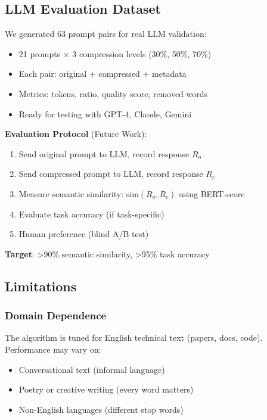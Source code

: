 \subsection{LLM Evaluation Dataset}

We generated 63 prompt pairs for real LLM validation:

\begin{itemize}
    \item 21 prompts × 3 compression levels (30\%, 50\%, 70\%)
    \item Each pair: original + compressed + metadata
    \item Metrics: tokens, ratio, quality score, removed words
    \item Ready for testing with GPT-4, Claude, Gemini
\end{itemize}

\textbf{Evaluation Protocol} (Future Work):
\begin{enumerate}
    \item Send original prompt to LLM, record response $R_o$
    \item Send compressed prompt to LLM, record response $R_c$
    \item Measure semantic similarity: $\text{sim}(R_o, R_c)$ using BERT-score
    \item Evaluate task accuracy (if task-specific)
    \item Human preference (blind A/B test)
\end{enumerate}

\textbf{Target}: >90\% semantic similarity, >95\% task accuracy

\subsection{Limitations}

\subsubsection{Domain Dependence}

The algorithm is tuned for English technical text (papers, docs, code). Performance may vary on:
\begin{itemize}
    \item Conversational text (informal language)
    \item Poetry or creative writing (every word matters)
    \item Non-English languages (different stop words)
\end{itemize}


